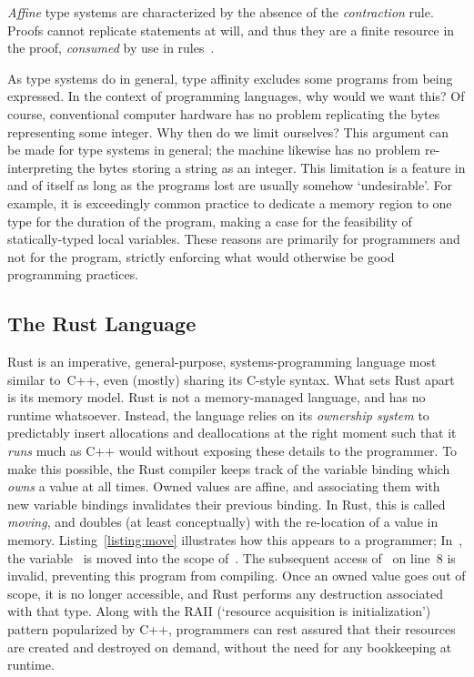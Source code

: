 \textit{Affine} type systems are characterized by the absence of the \textit{contraction} rule. Proofs cannot replicate statements at will, and thus they are a finite resource in the proof, \textit{consumed} by use in rules~\cite{walker2005substructural}.

As type systems do in general, type affinity excludes some programs from being expressed. In the context of programming languages, why would we want this? Of course, conventional computer hardware has no problem replicating the bytes representing some integer. Why then do we limit ourselves? This argument can be made for type systems in general; the machine likewise has no problem re-interpreting the bytes storing a string as an integer. This limitation is a feature in and of itself as long as the programs lost are usually somehow `undesirable'. For example, it is exceedingly common practice to dedicate a memory region to one type for the duration of the program, making a case for the feasibility of statically-typed local variables. These reasons are primarily for programmers and not for the program, strictly enforcing what would otherwise be good programming practices. 


\subsection{The Rust Language}
\label{sec:rust_language}
Rust is an imperative, general-purpose, systems-programming language most similar to~C++, even (mostly) sharing its C-style syntax. What sets Rust apart is its memory model. Rust is not a memory-managed language, and has no runtime whatsoever. Instead, the language relies on its \textit{ownership system} to predictably insert allocations and deallocations at the right moment such that it \textit{runs} much as C++ would without exposing these details to the programmer. To make this possible, the Rust compiler keeps track of the variable binding which \textit{owns} a value at all times. Owned values are affine, and associating them with new variable bindings invalidates their previous binding. In Rust, this is called \textit{moving}, and doubles (at least conceptually) with the re-location of a value in memory. Listing~\ref{listing:move} illustrates how this appears to a programmer; In~, the variable~ is moved into the scope of~. The subsequent access of~ on line~8 is invalid, preventing this program from compiling. Once an owned value goes out of scope, it is no longer accessible, and Rust performs any destruction associated with that type. Along with the RAII (`resource acquisition is initialization') pattern popularized by C++, programmers can rest assured that their resources are created and destroyed on demand, without the need for any bookkeeping at runtime.

